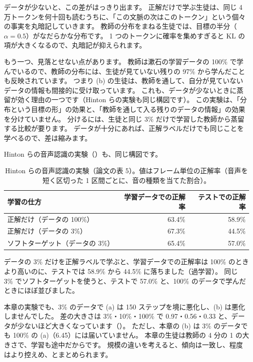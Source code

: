データが少ないと、この差がはっきり出ます。
正解だけで学ぶ生徒は、同じ 4 万トークンを何十回も読むうちに、「この文脈の次はこのトークン」という個々の事実を丸暗記していきます。
教師の分布をまねる生徒では、目標の半分（$\alpha=0.5$）がなだらかな分布です。
1 つのトークンに確率を集めすぎると KL の項が大きくなるので、丸暗記が抑えられます。

もう一つ、見落とせない点があります。
教師は漱石の学習データの 100\% で学んでいるので、教師の分布には、生徒が見ていない残りの 97\% から学んだことも反映されています。
つまり (b) の生徒は、教師を通して、自分が見ていないデータの情報も間接的に受け取っています。
これも、データが少ないときに蒸留が効く理由の一つです（Hinton らの実験も同じ構図です）。
この実験は、「分布という目標の形」の効果と、「教師を通して入る残りのデータの情報」の効果を分けていません。
分けるには、生徒と同じ 3\% だけで学習した教師から蒸留する比較が要ります。
データが十分にあれば、正解ラベルだけでも同じことを学べるので、差は縮みます。

Hinton らの音声認識の実験（）も、同じ構図です。

\begin{table}[tbp]
\centering
\caption{Hinton らの音声認識の実験（論文の表 5\cite{hinton2015distilling}）。値はフレーム単位の正解率（音声を短く区切った 1 区間ごとに、音の種類を当てた割合）。}
\label{tab:distill-hinton}
\begin{tabular}{lrr}
\toprule
学習の仕方 & 学習データでの正解率 & テストでの正解率 \\
\midrule
正解だけ（データの 100\%） & 63.4\% & 58.9\% \\
正解だけ（データの 3\%） & 67.3\% & 44.5\% \\
ソフトターゲット（データの 3\%） & 65.4\% & 57.0\% \\
\bottomrule
\end{tabular}
\end{table}


データの 3\% だけを正解ラベルで学ぶと、学習データでの正解率は 100\% のときより高いのに、テストでは 58.9\% から 44.5\% に落ちました（過学習）。
同じ 3\% でソフトターゲットを使うと、テストで 57.0\% と、100\% のデータで学んだときにほぼ並びました。

本章の実験でも、3\% のデータで (a) は 150 ステップを境に悪化し、(b) は悪化しませんでした。
差の大きさは 3\%・10\%・100\% で 0.97・0.56・0.33 と、データが少ないほど大きくなっています（）。
ただし、本章の (b) は 3\% のデータでも 100\% の (a)（6.45）には届いていません。
本章の生徒は教師の 4 分の 1 の大きさで、学習も途中だからです。
規模の違いを考えると、傾向は一致し、程度はより控えめ、とまとめられます。


